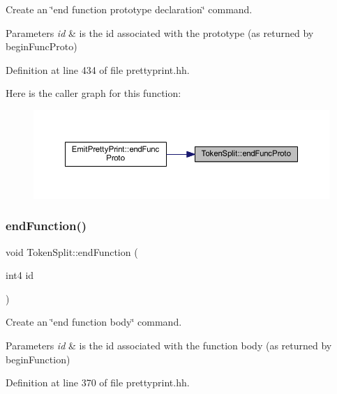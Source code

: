 Create an \char`\"{}end function prototype declaration\char`\"{} command. 


\begin{DoxyParams}{Parameters}
{\em id} & is the id associated with the prototype (as returned by begin\+Func\+Proto) \\
\hline
\end{DoxyParams}


Definition at line 434 of file prettyprint.\+hh.

Here is the caller graph for this function\+:
\nopagebreak
\begin{figure}[H]
\begin{center}
\leavevmode
\includegraphics[width=350pt]{class_token_split_a326e6e6c122f24b053e0653c9f18ac79_icgraph}
\end{center}
\end{figure}
\mbox{\label{class_token_split_a1be7d58dbc149fc75b6467e3c02ddb65}} 
\subsubsection{\texorpdfstring{endFunction()}{endFunction()}}
{\footnotesize\ttfamily void Token\+Split\+::end\+Function (\begin{DoxyParamCaption}\item[{int4}]{id }\end{DoxyParamCaption})\hspace{0.3cm}{\ttfamily [inline]}}



Create an \char`\"{}end function body\char`\"{} command. 


\begin{DoxyParams}{Parameters}
{\em id} & is the id associated with the function body (as returned by begin\+Function) \\
\hline
\end{DoxyParams}


Definition at line 370 of file prettyprint.\+hh.

